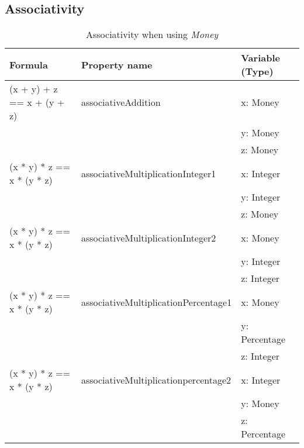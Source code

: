 \subsection*{Associativity}
\label{ssct:properties_associativity}
\FloatBarrier
\begin{table}[!ht]
\centering
\begin{tabular}{lll}
\hline
                        \textbf{Formula}           & \textbf{Property name}               & \textbf{Variable (Type)} \\ \hline
\rowcolor[HTML]{EFEFEF} (x + y) + z == x + (y + z) & associativeAddition                  & x: Money                 \\
\rowcolor[HTML]{EFEFEF}                            &                                      & y: Money                 \\
\rowcolor[HTML]{EFEFEF}                            &                                      & z: Money                 \\
                        (x * y) * z == x * (y * z) & associativeMultiplicationInteger1    & x: Integer               \\
                                                   &                                      & y: Integer               \\
                                                   &                                      & z: Money                 \\
\rowcolor[HTML]{EFEFEF} (x * y) * z == x * (y * z) & associativeMultiplicationInteger2    & x: Money                 \\
\rowcolor[HTML]{EFEFEF}                            &                                      & y: Integer               \\
\rowcolor[HTML]{EFEFEF}                            &                                      & z: Integer               \\
                        (x * y) * z == x * (y * z) & associativeMultiplicationPercentage1 & x: Money                 \\
                                                   &                                      & y: Percentage            \\
                                                   &                                      & z: Integer               \\
\rowcolor[HTML]{EFEFEF} (x * y) * z == x * (y * z) & associativeMultiplicationpercentage2 & x: Integer               \\
\rowcolor[HTML]{EFEFEF}                            &                                      & y: Money                 \\
\rowcolor[HTML]{EFEFEF}                            &                                      & z: Percentage            \\ \hline
\end{tabular}
\caption{Associativity when using \textit{Money}}
\label{tbl:ch4_money_associativity}
\end{table}
